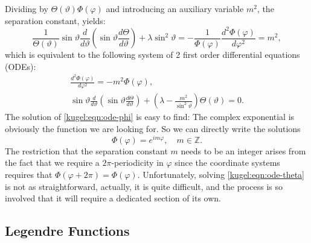 Dividing by $\Theta(\vartheta)\Phi(\varphi)$ and introducing an auxiliary
variable $m^2$, the separation constant, yields:
\begin{equation*}
  \frac{1}{\Theta(\vartheta)}\sin \vartheta \frac{d}{d \vartheta} \left(
    \sin \vartheta \frac{d \Theta}{d \vartheta}
  \right)
  + \lambda \sin^2 \vartheta
  = -\frac{1}{\Phi(\varphi)} \frac{d^2\Phi(\varphi)}{d\varphi^2}
  = m^2,
\end{equation*}
which is equivalent to the following system of 2 first order differential
equations (ODEs):
\begin{subequations}
  \begin{gather}
    \frac{d^2\Phi(\varphi)}{d\varphi^2} = -m^2 \Phi(\varphi),
      \label{kugel:eqn:ode-phi} \\ 
    \sin \vartheta \frac{d}{d \vartheta} \left(
      \sin \vartheta \frac{d \Theta}{d \vartheta}
    \right)
    + \left( \lambda - \frac{m^2}{\sin^2 \vartheta} \right)
      \Theta(\vartheta) = 0
      \label{kugel:eqn:ode-theta}.
  \end{gather}
\end{subequations}
The solution of \eqref{kugel:eqn:ode-phi} is easy to find: The complex
exponential is obviously the function we are looking for. So we can directly
write the solutions
\begin{equation} \label{kugel:eqn:ode-phi-sol}
    \Phi(\varphi) = e^{i m \varphi}, \quad m \in \mathbb{Z}.
\end{equation}
The restriction that the separation constant $m$ needs to be an integer arises
from the fact that we require a $2\pi$-periodicity in $\varphi$ since the
coordinate systems requires that $\Phi(\varphi + 2\pi) = \Phi(\varphi)$.
Unfortunately, solving \eqref{kugel:eqn:ode-theta} is not as straightforward,
actually, it is quite difficult, and the process is so involved that it will
require a dedicated section of its own.

\subsection{Legendre Functions}

